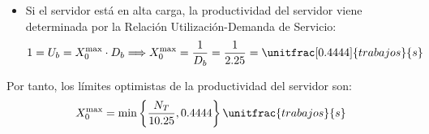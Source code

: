 \begin{ejercicio}
\begin{enumerate}
\begin{itemize}
            \item Si el servidor está en alta carga, la productividad del servidor viene determinada por la Relación Utilización-Demanda de Servicio:
            \begin{equation*}
                1 = U_b = X_0^{\text{max}} \cdot D_b
                \Longrightarrow X_0^{\text{max}} = \dfrac{1}{D_b} = \dfrac{1}{2.25} = \unitfrac[0.4444]{trabajos}{s}
            \end{equation*}
        \end{itemize}

        Por tanto, los límites optimistas de la productividad del servidor son:
        \begin{align*}
            X_0^{\text{max}} &= \min\left\{\dfrac{N_T}{10.25}, 0.4444\right\}\unitfrac{trabajos}{s} \\
        \end{align*}
    \end{enumerate}
\end{ejercicio}
\begin{comment}
\solucion
    \begin{enumerate}
        \item El cuello de botella es la cinta.
        \item El tiempo mínimo de respuesta es 4.25 segundos.
        \item El punto teórico de saturación es $N_T^* = 4.5$. Por lo tanto, el servidor está en un régimen de alta carga.
        \item Los límites son $R_0 \geq \max\{4.25, 2.25 \times N_T - 6\}$ y $X_0 \leq \min\{N_T/10.25, 0.44\}$.
    \end{enumerate}
\end{comment}

